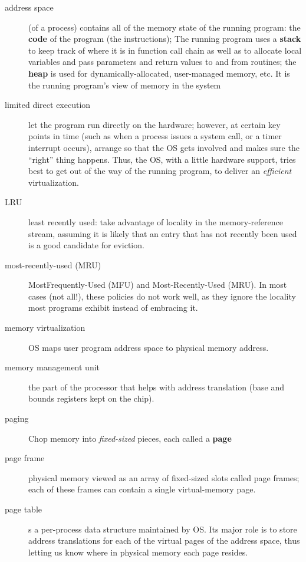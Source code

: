 \begin{description}
\item[address space] (of a process) contains all of the memory state of the
running program: the \textbf{code} of the program (the instructions); The running program uses a \textbf{stack} to keep track of where it is in function call chain as well as to allocate local variables and pass parameters and return values to and from routines; the \textbf{heap} is used for dynamically-allocated, user-managed memory, etc.  It is the running program’s view of memory in the system

\item[limited direct execution] let the program run directly on the hardware; however, at certain key points in time (such as when a process issues a system call, or a timer interrupt occurs), arrange so that the OS gets involved and makes sure the “right” thing happens.   Thus, the OS, with a little hardware support, tries best to get out of the way of the running program, to deliver an \emph{efficient} virtualization.

\item[LRU] least recently used: take advantage of locality in the memory-reference stream, assuming it is likely that an entry that has not recently been used is a good
candidate for eviction.

\item[most-recently-used (MRU)] MostFrequently-Used (MFU) and Most-Recently-Used (MRU). In most cases (not all!), these policies do not work well, as they ignore the locality most programs exhibit instead of embracing it.

\item[memory virtualization] OS maps user program address space to physical memory address.

\item[memory management unit] the part of the processor that helps with address translation (base and bounds registers kept on the chip).

\item[paging] Chop memory into \emph{fixed-sized} pieces, each called a \textbf{page}

\item[page frame] physical memory viewed as an array of fixed-sized slots called page frames; each of these frames can contain a single virtual-memory page.

\item[page table] s a per-process data structure maintained by OS.  Its major role is to store address translations for each of the virtual pages of the address space, thus letting us know where in physical memory each page resides.


\end{description}
